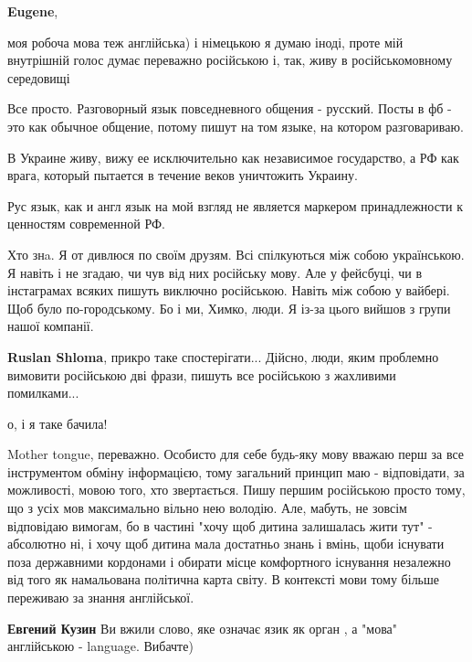 \begin{itemize}
\begin{itemize}
\textbf{Eugene}, 

моя робоча мова теж англійська) і німецькою я думаю іноді, проте мій внутрішній
голос думає переважно російською і, так, живу в російськомовному середовищі

\end{itemize} %


Все просто. Разговорный язык повседневного общения - русский. Посты в фб - это
как обычное общение, потому пишут на том языке, на котором разговариваю.

В Украине живу, вижу ее исключительно как независимое государство, а РФ как
врага, который пытается в течение веков уничтожить Украину.

Рус язык, как и англ язык на мой взгляд не является маркером принадлежности к
ценностям современной РФ.



Хто знa. Я от дивлюся по своїм друзям. Всі спілкуються між собою українською. Я
навіть і не згадаю, чи чув від них російську мову. Але у фейсбуці, чи в
інстаграмах всяких пишуть виключно російською. Навіть між собою у вайбері. Щоб
було по-городському. Бо і ми, Химко, люди. Я із-за цього вийшов з групи нашої
компанії.

\begin{itemize} %
\textbf{Ruslan Shloma}, прикро таке спостерігати... Дійсно, люди, яким проблемно вимовити російською дві фрази, пишуть все російською з жахливими помилками...

о, і я таке бачила!
\end{itemize} %


Mother tongue, переважно. Особисто для себе будь-яку мову вважаю перш за все
інструментом обміну інформацією, тому загальний принцип маю - відповідати, за
можливості, мовою того, хто звертається. Пишу першим російською просто тому, що
з усіх мов максимально вільно нею володію. Але, мабуть, не зовсім відповідаю
вимогам, бо в частині "хочу щоб дитина залишалась жити тут" - абсолютно ні, і
хочу щоб дитина мала достатньо знань і вмінь, щоби існувати поза державними
кордонами і обирати місце комфортного існування незалежно від того як
намальована політична карта світу. В контексті мови тому більше переживаю за
знання англійської.

\begin{itemize} %
\textbf{Евгений Кузин} Ви вжили слово, яке означає язик як орган , а "мова" англійською - language. Вибачте)


\end{itemize}
\end{itemize}
